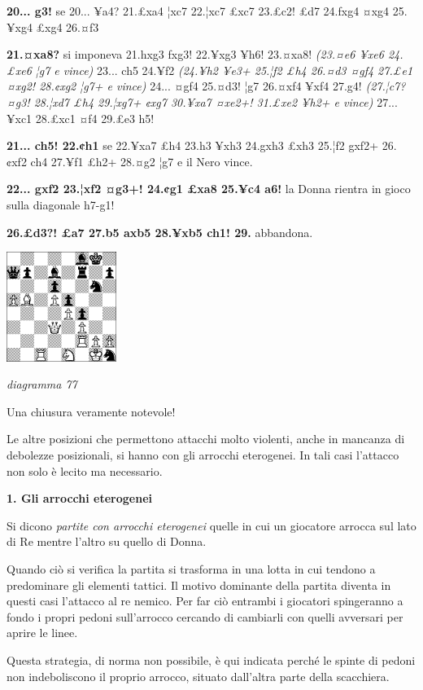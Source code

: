 \documentclass[
]{article}
\begin{document}
\textbf{20... g3!} se 20... ¥a4? 21.£xa4 ¦xc7 22.¦xc7 £xc7 23.£c2! £d7
24.fxg4 ¤xg4 25.¥xg4 £xg4 26.¤f3

\textbf{21.¤xa8?} si imponeva 21.hxg3 fxg3! 22.¥xg3 ¥h6! 23.¤xa8!
\emph{(23.¤e6 ¥xe6 24.£xe6 ¦g7 e vince)} 23... ch5 24.¥f2 \emph{(24.¥h2
¥e3+ 25.¦f2 £h4 26.¤d3 ¤gf4 27.£e1 ¤xg2! 28.¢xg2 ¦g7+ e vince)} 24...
¤gf4 25.¤d3! ¦g7 26.¤xf4 ¥xf4 27.g4! \emph{(27.¦c7? ¤g3! 28.¦xd7 £h4
29.¦xg7+ ¢xg7 30.¥xa7 ¤xe2+! 31.£xe2 ¥h2+ e vince)} 27... ¥xc1 28.£xc1
¤f4 29.£e3 h5!

\textbf{21... ch5! 22.¢h1} se 22.¥xa7 £h4 23.h3 ¥xh3 24.gxh3 £xh3 25.¦f2
gxf2+ 26.¢xf2 ch4 27.¥f1 £h2+ 28.¤g2 ¦g7 e il Nero vince.

\textbf{22... gxf2 23.¦xf2 ¤g3+! 24.¢g1 £xa8 25.¥c4 a6!} la Donna
rientra in gioco sulla diagonale h7-g1!

\textbf{26.£d3?! £a7 27.b5 axb5 28.¥xb5 ch1! 29.} abbandona.

\includegraphics[width=1.40139in,height=1.40139in]{vertopal_109f12be458a423d8f3cc838880eaea2/media/image77.png}

\emph{diagramma 77}

Una chiusura veramente notevole!

Le altre posizioni che permettono attacchi molto violenti, anche in
mancanza di debolezze posizionali, si hanno con gli arrocchi eterogenei.
In tali casi l'attacco non solo è lecito ma necessario.

\textbf{1. Gli arrocchi eterogenei}

Si dicono \emph{partite con arrocchi eterogenei} quelle in cui un
giocatore arrocca sul lato di Re mentre l'altro su quello di Donna.

Quando ciò si verifica la partita si trasforma in una lotta in cui
tendono a predominare gli elementi tattici. Il motivo dominante della
partita diventa in questi casi l'attacco al re nemico. Per far ciò
entrambi i giocatori spingeranno a fondo i propri pedoni sull'arrocco
cercando di cambiarli con quelli avversari per aprire le linee.

Questa strategia, di norma non possibile, è qui indicata perché le
spinte di pedoni non indeboliscono il proprio arrocco, situato
dall'altra parte della scacchiera.
\end{document}
